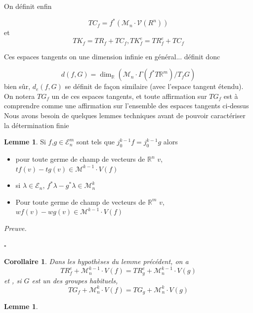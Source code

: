 \documentclass[a4paper,12pt,oneside,titlepage]{article}
\newcommand{\rightane}[3]{TR_{#1}^e}
\newcommand{\gentan}[3]{TG_{#1}}
\newcommand{\R}[0]{\mathbb{R}}
\theoremstyle{definition}
\newtheorem{lemme}[definition]{Lemme}
\theoremstyle{plain}
\newtheorem{corollaire}[definition]{Corollaire}
\newenvironment{preuve}
{\par\noindent\textit{Preuve.}\ }
{\hfill$\square$\par}
\begin{document}
On définit enfin 

\begin{equation*}
    TC_f = f^*(\mathcal{M}_n\cdot \mathcal{V}(R^n))
\end{equation*}
et 
\begin{equation*}
    TK_f= TR_f + TC_f, 
    TK^e_f= TR^e_f+ TC_f
\end{equation*}

Ces espaces tangents on une dimension infinie en général... définit donc 

\begin{equation*}
    d(f,G)=\dim_\R(\mathcal{M}_n\cdot \Gamma(f^*T\R^m)/T _fG)
\end{equation*}
bien sûr, $d_e(f,G)$ se définit de façon similaire (avec l'espace tangent étendu).
On notera $\gentan{f}{n}{m}$ un de ces espaces tangents, et toute affirmation sur $\gentan{f}{n}{m}$ est à comprendre comme une affirmation sur l'ensemble des espaces tangents ci-dessus
Nous avons besoin de quelques lemmes techniques avant de pouvoir caractériser la détermination finie
\begin{lemme}
    Si $f$,$g\in\mathcal{E}_n^m$ sont tels que $j^{k-1}_0f=j^{k-1}_0g$ alors
    \begin{itemize}
        \item pour toute germe de champ de vecteurs  de $\R^n$ $v$, $tf(v)-tg(v)\in \mathcal{M}^{k-1}\cdot V(f)$
        \item si $\lambda\in\mathcal{E}_n$, $f^*\lambda-g^{*}\lambda\in\mathcal{M}^k_n$
        \item Pour toute germe de champ de vecteurs  de $\R^m$ $v$, $wf(v)-wg(v)\in \mathcal{M}^{k-1}\cdot V(f)$
    \end{itemize}
\end{lemme}
\begin{preuve}
    
\end{preuve}

\begin{corollaire}
Dans les hypothèses du lemme précédent, on a 
\begin{equation*}
    \rightane{f}{n}{m}+\mathcal{M}^{k-1}_n\cdot V(f)=\rightane{g}{n}{m}+\mathcal{M}^{k-1}_n\cdot V(g)
\end{equation*}
et , si $G$ est un des groupes habituels,
\begin{equation*}
        \gentan{f}{n}{m}+\mathcal{M}^{k}_n\cdot V(f)=\gentan{g}{n}{m}+\mathcal{M}^{k}_n\cdot V(g)
\end{equation*}
\end{corollaire}
\begin{lemme}
    
\end{lemme}
\end{document}
